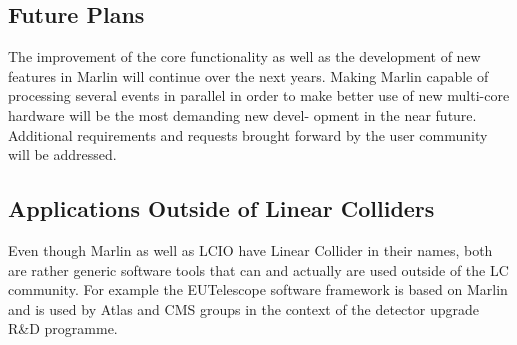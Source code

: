 \subsection{Future Plans}
The improvement of the core functionality as well as the development of new features in Marlin will continue over the next years. Making Marlin capable of processing several events in parallel in order to make better use of new multi-core hardware will be the most demanding new devel- opment in the near future. Additional requirements and requests brought forward by the user community will be addressed.


\subsection{Applications Outside of Linear Colliders}
Even though Marlin as well as LCIO have Linear Collider in their names, both are rather generic software tools that can and actually are used outside of the LC community. For example the EUTelescope software framework is based on Marlin and is used by Atlas and CMS groups in the context of the detector upgrade R\&D programme.
